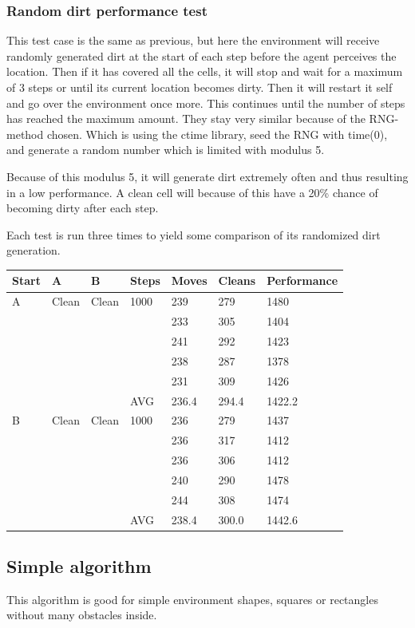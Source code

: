 \subsubsection{Random dirt performance test}
This test case is the same as previous, but here the environment will receive
randomly generated dirt at the start of each step before the agent perceives the
location.  Then if it has covered all the cells, it will stop and wait for
a maximum of 3 steps or until its current location becomes dirty. Then it will
restart it self and go over the environment once more. This continues until the
number of steps has reached the maximum amount.  They stay very similar because
of the RNG-method chosen. Which is using the ctime library, seed the RNG with
time(0), and generate a random number which is limited with modulus 5.

Because of this modulus 5, it will generate dirt extremely often and thus
resulting in a low performance.  A clean cell will because of this have a 20\%
chance of becoming dirty after each step.

Each test is run three times to yield some comparison of its randomized dirt
generation.

\begin{longtable}{p{} p{} p{} 
									p{} p{} p{} 
									p{}}
Start	& A & B & Steps & Moves & Cleans & Performance \\\hline
A & Clean & Clean & 1000 
		 & 239 & 279 & 1480 \\
	&&&& 233 & 305 & 1404 \\
	&&&& 241 & 292 & 1423 \\
	&&&& 238 & 287 & 1378 \\
	&&&& 231 & 309 & 1426 \\\hline
  &&& AVG & 236.4 & 294.4 & 1422.2\\\hline

B & Clean & Clean & 1000 
		 & 236 & 279 & 1437 \\
	&&&& 236 & 317 & 1412 \\
	&&&& 236 & 306 & 1412 \\
	&&&& 240 & 290 & 1478 \\
	&&&& 244 & 308 & 1474 \\\hline
  &&& AVG & 238.4 & 300.0 & 1442.6 \\\hline
\end{longtable}


\subsection{Simple algorithm}
	This algorithm is good for simple environment shapes, squares or rectangles without many obstacles inside.
	
